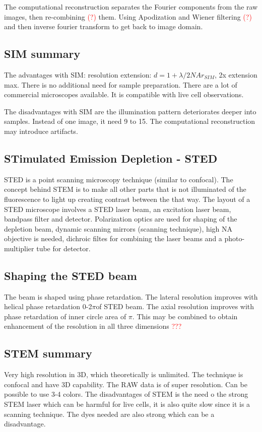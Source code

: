 	The computational reconstruction separates the Fourier components from the raw images, then re-combining \textcolor{red}{(?)}  them. Using Apodization and Wiener filtering \textcolor{red}{(?)}  and then inverse fourier transform to get back to image domain.   

	\subsection{SIM summary}
	
	The advantages with SIM: resolution extension: $d = 1 + \lambda /2NA r_{SIM}$, 2x extension max. There is no additional need for sample preparation. There are a lot of commercial microscopes available. It is compatible with live cell observations. 

	The disadvantages with SIM are the illumination pattern deteriorates deeper into samples. Instead of one image, it need 9 to 15. The computational reconstruction may introduce artifacts. 


	\subsection{STimulated Emission Depletion - STED}
	STED is a point scanning microscopy technique (similar to confocal). The concept behind STEM is to make all other parts that is not illuminated of the fluorescence to light up creating contrast between the that way. The layout of a STED microscope involves a STED laser beam, an excitation laser beam, bandpass filter and detector. Polarization optics are used for shaping of the depletion beam, dynamic scanning mirrors (scanning technique), high NA objective is needed, dichroic filtes for combining the laser beams and a photo-multiplier tube for detector. 

	\subsection{Shaping the STED beam}
	The beam is shaped using phase retardation. The lateral resolution improves with helical phase retardation 0-2$\pi$of STED beam. The axial resolution improves with phase retardation of inner circle area of $\pi$. This may be combined to obtain enhancement of the resolution in all three dimensions \textcolor{red}{???} 

	\subsection{STEM summary}
	Very high resolution in 3D, which theoretically is unlimited. The technique is confocal and have 3D capability. The RAW data is of super resolution. Can be possible to use 3-4 colors. The disadvantages of STEM is the need o the strong STEM laser which can be harmful for live cells, it is also quite slow since it is a scanning technique. The dyes needed are also strong which can be a disadvantage. 

